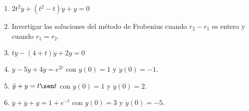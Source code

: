 \documentclass{article}
\begin{document}
\begin{enumerate}
        \item {
            $2t^2\ddot y + (t^2 - t)\dot y + y = 0$

            \color{azul}

        }

        \item {
            Invertigar las soluciones del método de Frobenius cuando $r_2 - r_1$
            es entero y cuando $r_1 = r_2$.

            \color{azul}
        }

        \item {
            $t\ddot y - (4 + t)\dot y + 2y = 0$

            \color{azul}
        }

        \item {
            $\ddot y - 5 \dot y + 4y = e^{2t}$ con $y(0) = 1$ y $\dot y(0) = -1$.

            \color{azul}
        }

        \item {
            $\ddot y + y = t\sen t$ con $y(0) = 1$ y  $\dot y(0) = 2$.

            \color{azul}
        }

        \item {
            $\ddot y + \dot y + y = 1 + e^{-t}$ con $y(0) = 3$ y $\dot y(0) = -5$.

            \color{azul}
        }
    \end{enumerate}
\end{document}
